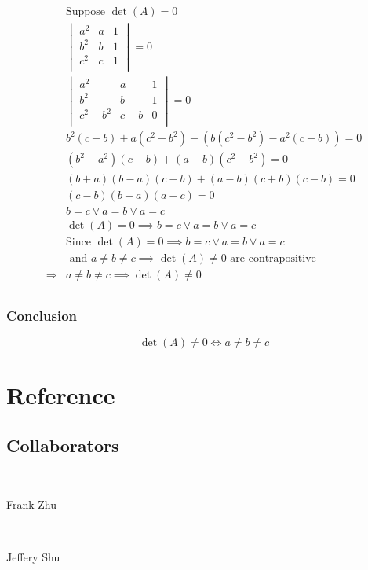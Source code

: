 \documentclass{article}
\begin{document}
\begin{equation*}
    \begin{split}
        &\text{Suppose }\det(A)=0\\
        &\begin{vmatrix}
            a^2&a&1\\
            b^2&b&1\\
            c^2&c&1\\
        \end{vmatrix}=0\\
        &\begin{vmatrix}
            a^2&a&1\\
            b^2&b&1\\
            c^2-b^2&c-b&0\\
        \end{vmatrix}=0\\
        &b^2(c-b)+a(c^2-b^2)-(b(c^2-b^2)-a^2(c-b))=0\\
        &(b^2-a^2)(c-b)+(a-b)(c^2-b^2)=0\\
        &(b+a)(b-a)(c-b)+(a-b)(c+b)(c-b)=0\\
        &(c-b)(b-a)(a-c)=0\\
        &b=c\lor a=b\lor a=c\\
        &\det(A)=0 \implies b=c\lor a=b\lor a=c\\
        &\text{Since }\det(A)=0 \implies b=c\lor a=b\lor a=c \\
        &\text{ and }a\ne b\ne c\implies\det(A)\ne0\text{ are contrapositive}\\
        \Rightarrow&a\ne b\ne c\implies\det(A)\ne0\\
    \end{split}
\end{equation*}

\subsubsection{Conclusion}

\begin{equation*}
    \det(A)\ne0\Leftrightarrow a\ne b\ne c
\end{equation*}

\newpage

\section{Reference}

\subsection{Collaborators}

~

Frank Zhu

~

Jeffery Shu
\end{document}
